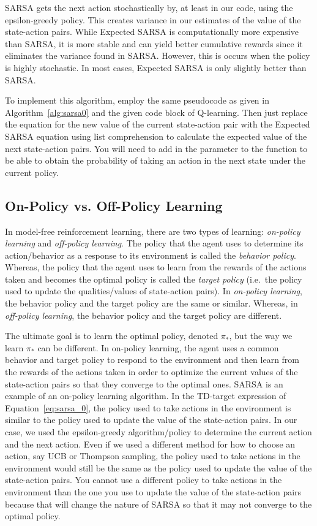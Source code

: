 SARSA gets the next action stochastically by, at least in our code, using the epsilon-greedy policy.
This creates variance in our estimates of the value of the state-action pairs.
While Expected SARSA is computationally more expensive than SARSA, it is more stable and can yield better cumulative rewards since it eliminates the variance found in SARSA.
However, this is occurs when the policy is highly stochastic.
In most cases, Expected SARSA is only slightly better than SARSA.

To implement this algorithm, employ the same pseudocode as given in Algorithm\ \ref{alg:sarsa0} and the given code block of Q-learning.
Then just replace the equation for the new value of the current state-action pair with the Expected SARSA equation using list comprehension to calculate the expected value of the next state-action pairs.
You will need to add in the parameter  to the function to be able to obtain the probability of taking an action in the next state under the current policy.

\subsection*{On-Policy vs. Off-Policy Learning}
In model-free reinforcement learning, there are two types of learning: \emph{on-policy learning} and \emph{off-policy learning}.
The policy that the agent uses to determine its action/behavior as a response to its environment is called the \emph{behavior policy}.
Whereas, the policy that the agent uses to learn from the rewards of the actions taken and becomes the optimal policy is called the \emph{target policy} (i.e.\ the policy used to update the qualities/values of state-action pairs).
In \emph{on-policy learning}, the behavior policy and the target policy are the same or similar.
Whereas, in \emph{off-policy learning}, the behavior policy and the target policy are different.

The ultimate goal is to learn the optimal policy, denoted $\pi_*$, but the way we learn $\pi_*$ can be different.
In on-policy learning, the agent uses a common behavior and target policy to respond to the environment and then learn from the rewards of the actions taken in order to optimize the current values of the state-action pairs so that they converge to the optimal ones.
SARSA is an example of an on-policy learning algorithm.
In the TD-target expression of Equation\ \ref{eq:sarsa_0}, the policy used to take actions in the environment is similar to the policy used to update the value of the state-action pairs.
In our case, we used the epsilon-greedy algorithm/policy to determine the current action and the next action.
Even if we used a different method for how to choose an action, say UCB or Thompson sampling, the policy used to take actions in the environment would still be the same as the policy used to update the value of the state-action pairs.
You cannot use a different policy to take actions in the environment than the one you use to update the value of the state-action pairs because that will change the nature of SARSA so that it may not converge to the optimal policy.

